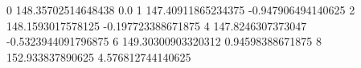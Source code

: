 0 148.35702514648438 0.0
1 147.40911865234375 -0.947906494140625
2 148.1593017578125 -0.197723388671875
4 147.8246307373047 -0.5323944091796875
6 149.30300903320312 0.94598388671875
8 152.933837890625 4.576812744140625

